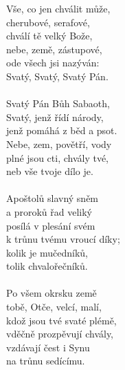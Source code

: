 \begin{translatioMulticol}{3}
Vše, co jen chválit může,\\
cherubové, serafové,\\
chválí tě velký Bože,\\
nebe, země, zástupové,\\
ode všech jsi nazýván:\\
Svatý, Svatý, Svatý Pán.\\
\\
Svatý Pán Bůh Sabaoth,\\
Svatý, jenž řídí národy,\\
jenž pomáhá z běd a psot.\\
Nebe, zem, povětří, vody\\
plné jsou cti, chvály tvé,\\
neb vše tvoje dílo je.\\
\\
Apoštolů slavný sněm\\
a proroků řad veliký\\
posílá v plesání svém\\
k trůnu tvému vroucí díky;\\
kolik je mučedníků,\\
tolik chvalořečníků.\\
\\
Po všem okrsku země\\
tobě, Otče, velcí, malí,\\
kdož jsou tvé svaté plémě,\\
vděčně prozpěvují chvály,\\
vzdávají čest i Synu\\
na trůnu sedícímu.\columnbreak


\end{translatioMulticol}
